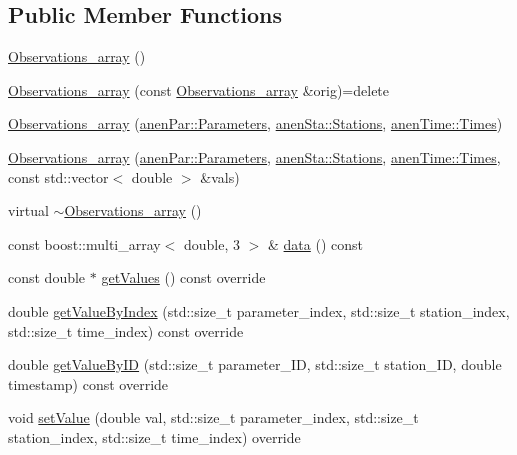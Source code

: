 \subsection*{Public Member Functions}
\begin{DoxyCompactItemize}
\item 
\mbox{\hyperlink{class_observations__array_ad161de2b3dd6537a040c2dbda002ccaf}{Observations\+\_\+array}} ()
\item 
\mbox{\hyperlink{class_observations__array_aa448781dd6c9c75fd3fa8ebf0e41e86d}{Observations\+\_\+array}} (const \mbox{\hyperlink{class_observations__array}{Observations\+\_\+array}} \&orig)=delete
\item 
\mbox{\hyperlink{class_observations__array_afff89d6d2bb295ae83c2dc02d2529ea3}{Observations\+\_\+array}} (\mbox{\hyperlink{classanen_par_1_1_parameters}{anen\+Par\+::\+Parameters}}, \mbox{\hyperlink{classanen_sta_1_1_stations}{anen\+Sta\+::\+Stations}}, \mbox{\hyperlink{classanen_time_1_1_times}{anen\+Time\+::\+Times}})
\item 
\mbox{\hyperlink{class_observations__array_a637c1332dca79ca5141ea513e86e1eb8}{Observations\+\_\+array}} (\mbox{\hyperlink{classanen_par_1_1_parameters}{anen\+Par\+::\+Parameters}}, \mbox{\hyperlink{classanen_sta_1_1_stations}{anen\+Sta\+::\+Stations}}, \mbox{\hyperlink{classanen_time_1_1_times}{anen\+Time\+::\+Times}}, const std\+::vector$<$ double $>$ \&vals)
\item 
virtual \mbox{\hyperlink{class_observations__array_a3124448be571f561a2bd2e8b44c95a2e}{$\sim$\+Observations\+\_\+array}} ()
\item 
const boost\+::multi\+\_\+array$<$ double, 3 $>$ \& \mbox{\hyperlink{class_observations__array_a085f4583439ecdd3327f3fac1e6bd2ce}{data}} () const
\item 
const double $\ast$ \mbox{\hyperlink{class_observations__array_ac024322acc4826e7fa60fddc74e4b3a3}{get\+Values}} () const override
\item 
double \mbox{\hyperlink{class_observations__array_aa90203b110c6fb6bda4e201df163510d}{get\+Value\+By\+Index}} (std\+::size\+\_\+t parameter\+\_\+index, std\+::size\+\_\+t station\+\_\+index, std\+::size\+\_\+t time\+\_\+index) const override
\item 
double \mbox{\hyperlink{class_observations__array_a42449c7be492f7df27d74c370c8e719f}{get\+Value\+By\+ID}} (std\+::size\+\_\+t parameter\+\_\+\+ID, std\+::size\+\_\+t station\+\_\+\+ID, double timestamp) const override
\item 
void \mbox{\hyperlink{class_observations__array_aa6b6e042f8db0afad3beaff248b4a602}{set\+Value}} (double val, std\+::size\+\_\+t parameter\+\_\+index, std\+::size\+\_\+t station\+\_\+index, std\+::size\+\_\+t time\+\_\+index) override

\end{DoxyCompactItemize}
